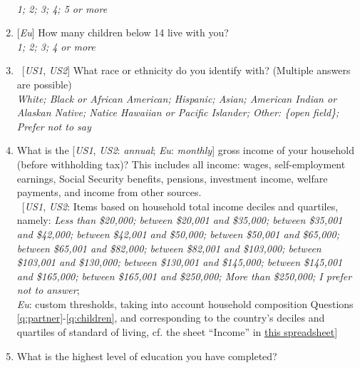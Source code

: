 \documentclass[12pt,english]{article}
\begin{document}
\begin{enumerate}
\\ \textit{1; 2; 3; 4; 5 or more}
\item \label{q:children} [\textit{Eu}] How many children below 14 live with you?
\\ \textit{1; 2; 3; 4 or more}
\item ~[\textit{US1}, \textit{US2}] What race or ethnicity do you identify with? (Multiple answers are possible) 
\\ \textit{White; Black or African American; Hispanic; Asian; American Indian or Alaskan Native; Natice Hawaiian or Pacific Islander; Other: \{open field\}; Prefer not to say}
\item What is the [\textit{US1}, \textit{US2}: \textit{annual}; \textit{Eu}: \textit{monthly}] gross income of your household (before withholding tax)? This includes all income: wages, self-employment earnings, Social Security benefits, pensions, investment income, welfare payments, and income from other sources. %
\\ ~[\textit{US1}, \textit{US2}: Items based on household total income deciles and quartiles, namely: \textit{Less than \$20,000; between \$20,001 and \$35,000; between \$35,001 and \$42,000; between \$42,001 and \$50,000; between \$50,001 and \$65,000; between \$65,001 and \$82,000; between \$82,001 and \$103,000; between \$103,001 and \$130,000; between \$130,001 and \$145,000; between \$145,001 and \$165,000; between \$165,001 and \$250,000; More than \$250,000; I prefer not to answer}; \\ \textit{Eu}: custom thresholds, taking into account household composition Questions \ref{q:partner}-\ref{q:children}, and corresponding to the country's deciles and quartiles of standard of living, cf. the sheet ``Income'' in \href{https://github.com/bixiou/international_attitudes_toward_global_policies/raw/main/questionnaire/specificities.xlsx}{this spreadsheet}]
\item What is the highest level of education you have completed? 

\end{enumerate}
\end{document}
